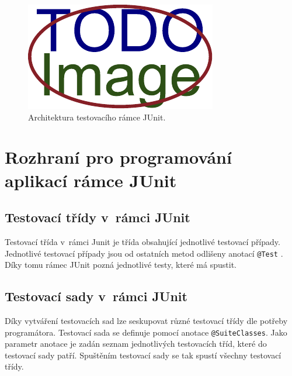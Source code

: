     \begin{figure}[!h]
      \includegraphics[width=\textwidth, center]{obrazky-figures/placeholder.pdf}
      \caption{Architektura testovacího rámce JUnit.}
      \label{fig:junit_arch}
    \end{figure}


  \section{Rozhraní pro programování aplikací rámce JUnit}
    
    \subsection{Testovací třídy v~rámci JUnit}
    Testovací třída v~rámci Junit je třída obsahující jednotlivé testovací případy. Jednotlivé testovací případy jsou od ostatních metod odlišeny anotací \texttt{@Test} \cite{vogella:JUnit}. Díky tomu rámec JUnit pozná jednotlivé testy, které má spustit.
    
    \subsection{Testovací sady v~rámci JUnit}
    Díky vytváření testovacích sad lze seskupovat různé testovací třídy dle potřeby programátora. Testovací sada se definuje pomocí anotace \texttt{@SuiteClasses}. Jako parametr anotace je zadán seznam jednotlivých testovacích tříd, které do testovací sady patří. Spuštěním testovací sady se tak spustí všechny testovací třídy.
    
